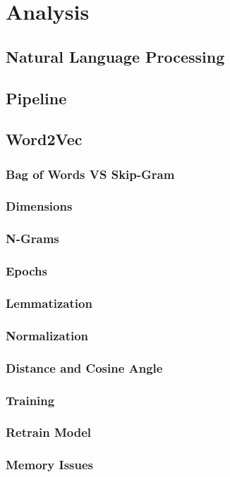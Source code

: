 \chapter{Analysis}
\label{chap:analysis}
\section{Natural Language Processing}
\section{Pipeline}
\section{Word2Vec}
\subsection{Bag of Words VS Skip-Gram}
\subsection{Dimensions}
\subsection{N-Grams}
\subsection{Epochs}
\subsection{Lemmatization}
\subsection{Normalization}
\subsection{Distance and Cosine Angle}
\subsection{Training}
\subsection{Retrain Model}
\subsection{Memory Issues}
